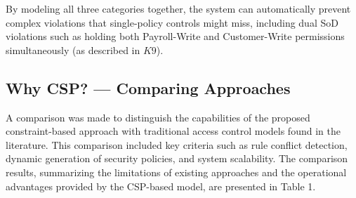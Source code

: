 \documentclass[conference]{IEEEtran}
\begin{document}
By modeling all three categories together, the system can automatically prevent
complex violations that single-policy controls might miss, including dual SoD
violations such as holding both Payroll-Write and Customer-Write permissions
simultaneously (as described in $K9$).
 \subsection{ Why CSP? — Comparing Approaches}
 A comparison was made to distinguish the capabilities of the proposed constraint-based approach with traditional access control models found in the literature. This comparison included key criteria such as rule conflict detection, dynamic generation of security policies, and system scalability. The comparison results, summarizing the limitations of existing approaches and the operational advantages provided by the CSP-based model, are presented in Table 1.
 
\end{document}
